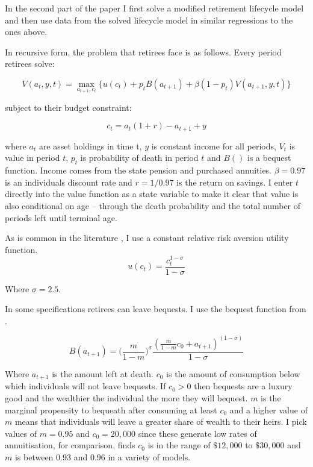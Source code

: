 \documentclass[12pt]{article}
\begin{document}
In the second part of the paper I first solve a modified retirement lifecycle
model and then use data from the solved lifecycle model in similar regressions
to the ones above.

In recursive form, the problem that retirees face is as follows. Every period
retirees solve:

\begin{equation*}
    V(a_{t}, y, t) = \underset{a_{t+1}, c_{t}}{\max} \{ u(c_{t}) + p_{t}B(a_{t+1}) + \beta(1-p_{t})V(a_{t+1}, y, t) \}
\end{equation*}

subject to their budget constraint:

\begin{equation*}
    c_{t} =a_{
    t}(1 +r) -  a_{t+1} + y
\end{equation*}

where $a_{t}$ are asset holdings in time t, $y$ is constant income for all
periods, $V_{t}$ is value in period $t$, $p_{t}$ is probability of death in
period $t$ and $B()$ is a bequest function. Income comes from the state pension
and purchased annuities. $\beta = 0.97$ is an individuals discount rate and
$r = 1/0.97$ is the return on savings. I enter $t$ directly into the value
function as a state variable to make it clear that value is also conditional on
age -- through the death probability and the total number of periods left until
terminal age.

As is common in the literature \cite{lockwood_red_2012}, I use a constant relative
risk aversion utility function.
\begin{equation*}
    u(c_{t}) = \frac{c_{t}^{1 - \sigma}}{1 - \sigma}
\end{equation*}

Where $\sigma = 2.5$.

In some specifications retirees can leave bequests. I use the bequest function
from \cite{lockwood_red_2012}.

\begin{equation*}
    B(a_{t+1}) = \bigl( \frac{m}{1 - m} \bigr)^{\sigma}  \frac{(\frac{m}{1 - m}c_{0} + a_{t+1})^{(1 - \sigma)}}{1 - \sigma}
\end{equation*}

Where $a_{t+1}$ is the amount left at death. $c_{0}$ is the amount of
consumption below which individuals will not leave bequests. If $c_{0} >0$ then
bequests are a luxury good and the wealthier the individual the more they will
bequest. $m$ is the marginal propensity to bequeath after consuming at least
$c_{0}$ and a higher value of $m$ means that individuals will leave a greater
share of wealth to their heirs. I pick values of $m = 0.95$ and $c_{0} = 20,000$
since these generate low rates of annuitisation, for comparison,
\cite{lockwood_aer_2018} finds $c_{0}$ is in the range of $\$12,000$ to
$\$30,000$ and $m$ is between $0.93$ and $0.96$ in a variety of models.
\end{document}
